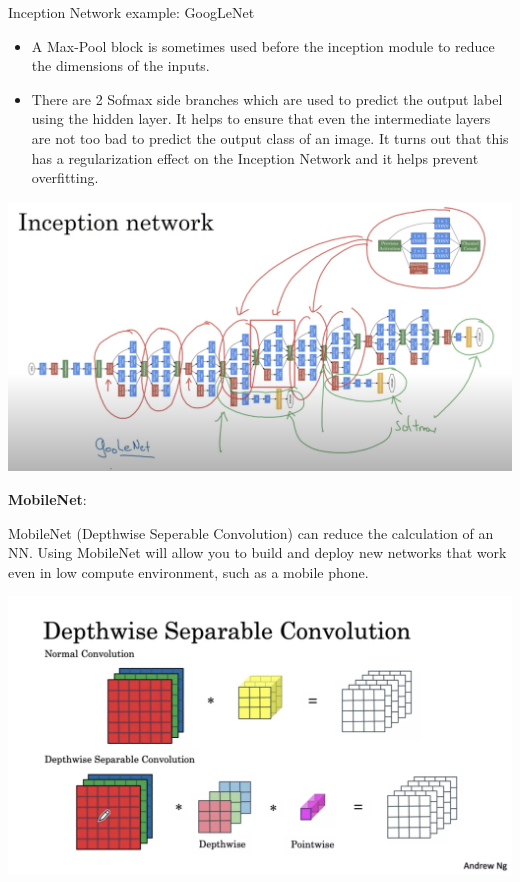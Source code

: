 \documentclass{article}
\begin{document}
\noindent Inception Network example: GoogLeNet

\begin{itemize}
    \item A Max-Pool block is sometimes used before the inception module to reduce the dimensions of the inputs.
    \item There are 2 Sofmax side branches which are used to predict the output label using the hidden layer. It helps to ensure that even the intermediate layers are not too bad to predict the output class of an image. It turns out that this has a regularization effect on the Inception Network and it helps prevent overfitting.
\end{itemize}

\begin{center}
\includegraphics[scale=0.4]{./images/inception_googlenet.png}
\end{center}

\noindent \textbf{MobileNet}:

\noindent MobileNet (Depthwise Seperable Convolution) can reduce the calculation of an NN. Using MobileNet will allow you to build and deploy new networks that work even in low compute environment, such as a mobile phone.

\begin{center}
\includegraphics[scale=0.3]{./images/mobilenet_compare.png}
\end{center}
\end{document}

